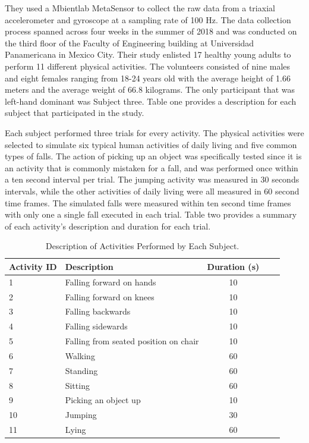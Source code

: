 \documentclass{llncs}
\begin{document}
They used a Mbientlab MetaSensor to collect the raw data from a triaxial accelerometer and gyroscope at a sampling rate of 100 Hz. The data collection process spanned across four weeks in the summer of 2018 and was conducted on the third floor of the Faculty of Engineering building at Universidad Panamericana in Mexico City.\cite{martinez2019up} Their study enlisted 17 healthy young adults to perform 11 different physical activities. The volunteers consisted of nine males and eight females ranging from 18-24 years old with the average height of 1.66 meters and the average weight of 66.8 kilograms. The only participant that was left-hand dominant was Subject three. Table one provides a description for each subject that participated in the study.
	
	Each subject performed three trials for every activity. The physical activities were selected to simulate six typical human activities of daily living and five common types of falls. The action of picking up an object was specifically tested since it is an activity that is commonly mistaken for a fall, and was performed once within a ten second interval per trial. The jumping activity was measured in 30 seconds intervals, while the other activities of daily living were all measured in 60 second time frames. The simulated falls were measured within ten second time frames with only one a single fall executed in each trial. Table two provides a summary of each activity's description and duration for each trial.

\begin{table}
	\begin{center}
		\caption{Description of Activities Performed by Each Subject.}
		\label{table2}
		\begin{tabular}{llclr}
			\toprule
			Activity ID & Description & Duration (s)\\
			\midrule
			1 &  Falling forward on hands & 10\\
			2 &  Falling forward on knees & 10\\
			3 & Falling backwards & 10\\
			4 & Falling sidewards & 10\\
			5 & Falling from seated position on chair & 10\\
			6 & Walking & 60\\
			7 & Standing & 60\\
			8 & Sitting & 60\\
			9 & Picking an object up & 10\\
			10 & Jumping & 30\\
			11 & Lying & 60\\
			\bottomrule
		\end{tabular}
	\end{center}
\end{table}
\end{document}
